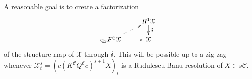 \documentclass[11pt]{amsart} \renewcommand{\baselinestretch}{1.2}
\theoremstyle{plain}
\numberwithin{equation}{section} %
\theoremstyle{plain}
\numberwithin{equation}{chapter} %
\renewcommand{\to}{\longrightarrow}
\newcommand{\from}{\longleftarrow}
\newcommand{\frakt}{\mathfrak{t}}
\newcommand{\fraks}{\mathfrak{s}}
\newcommand{\calx}{\mathcal{X}}
\newcommand{\calc}{\mathcal{C}}
\newcommand{\quadgrad}[1]{\mathrm{q}_{#1}}
\newcommand{\Dendo}{R}
\begin{document}
\begin{Operations on the Bousfield-Kan spectral sequence}
A reasonable goal is to create a factorization
\[\xymatrix@R=4mm{
&%
\Dendo^1\calx\ar[d]^-{\delta}
\\%
\quadgrad{2}F^{\calc}\calx\ar@{..>}[ur]
\ar[r]
&%
\calx%
}\]
of the structure map of $\calx$ through $\delta$. This will be possible up to a zig-zag whenever $\calx^s_t=(c(K^{\calc}Q^{\calc}c)^{s+1}X)_t$ is a  Radulescu-Banu resolution of $X\in s\calc$. 
%
%
%
%





\end{Operations on the Bousfield-Kan spectral sequence}
\end{document}

